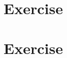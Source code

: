 \documentclass[a4paper]{article}
\begin{document}
\maketitle

\newpage
\tableofcontents
\newpage

\section{Exercise}
\subsection{}

\subsection{}

\subsection{}

\subsection{}


\section{Exercise}
\subsection{}

\subsection{}

\end{document}

